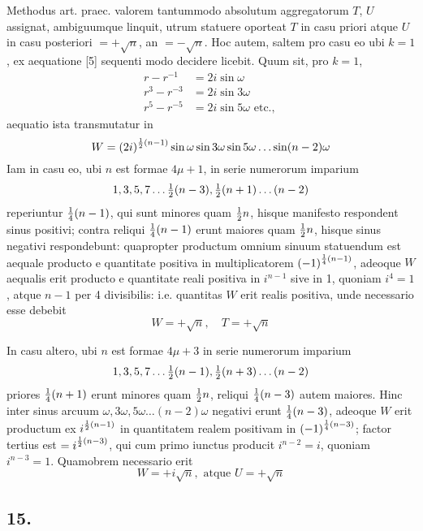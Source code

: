 \documentclass[twoside,12pt, showframe]{memoir}
\let\oldfrac\frac
\def\frac#1#2{\mathchoice{\tfrac{#1}{#2}}{\oldfrac{#1}{#2}}{\genfrac{}{}{}{2}{#1}{#2\mathstrut}}{\genfrac{}{}{}{3}{#1}{#2\mathstrut}}}
\begin{document}
Methodus art. praec. valorem tantummodo absolutum aggregatorum \(T\), \(U\) assignat, ambiguumque linquit, utrum statuere oporteat \(T\) in casu priori atque \(U\) in casu posteriori \(=+ \surd n\), an \(=-\surd n\). Hoc autem, saltem pro casu eo ubi \(k=1\), ex aequatione [5] sequenti modo decidere licebit. Quum sit, pro \(k=1\),\clearpage\noindent%
\[\begin{aligned}
r-r^{-1} & =2 i \sin \omega \\
r^{3}-r^{-3} & =2 i \sin 3 \omega \\
r^{5}-r^{-5} & =2 i \sin 5 \omega \text{ etc., }
\end{aligned}\]
aequatio ista transmutatur in
\[W=(2 i)^{\frac{1}{2}(n-1)} \sin \omega \sin 3 \omega \sin 5 \omega \ldots \sin (n-2) \omega\]
Iam in casu eo, ubi \(n\) est formae \(4 \mu+1\), in serie numerorum imparium
\[1,3,5,7 \ldots \frac{1}{2}(n-3), \frac{1}{2}(n+1) \ldots(n-2)\]
reperiuntur \(\frac{1}{4}(n-1)\), qui sunt minores quam \(\frac{1}{2} n\), hisque manifesto respondent sinus positivi; contra reliqui \(\frac{1}{4}(n-1)\) erunt maiores quam \(\frac{1}{2} n\), hisque sinus negativi respondebunt: quapropter productum omnium sinuum statuendum est aequale producto e quantitate positiva in multiplicatorem \((-1)^{\frac{1}{4}(n-1)}\), adeoque \(W\) aequalis erit producto e quantitate reali positiva in \(i^{n-1}\) sive in 1, quoniam \(i^{4}=1\), atque \(n-1\) per 4 divisibilis: i.e. quantitas \(W\) erit realis positiva, unde necessario esse debebit
\[W=+\surd n, \quad T=+\surd n\]

In casu altero, ubi \(n\) est formae \(4 \mu+3\) in serie numerorum imparium
\[1,3,5,7 \ldots \frac{1}{2}(n-1), \frac{1}{2}(n+3) \ldots(n-2)\]
priores \(\frac{1}{4}(n+1)\) erunt minores quam \(\frac{1}{2} n\), reliqui \(\frac{1}{4}(n-3)\) autem maiores. Hinc inter sinus arcuum \(\omega, 3 \omega, 5 \omega \ldots(n-2) \omega\) negativi erunt \(\frac{1}{4}(n-3)\), adeoque \(W\) erit productum ex \(i^{\frac{1}{2}(n-1)}\) in quantitatem realem positivam in \((-1)^{\frac{1}{4}(n-3)}\); factor tertius est \(=i^{\frac{1}{2}(n-3)}\), qui cum primo iunctus producit \(i^{n-2}=i\), quoniam \(i^{n-3}=1\). Quamobrem necessario erit
\[W=+i \surd n, \text{ atque } U=+\surd n\]

\subsection*{15.}
 
\end{document}
